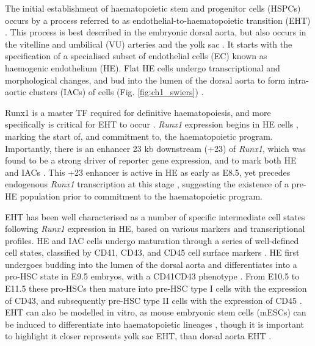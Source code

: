 The initial establishment of haematopoietic stem and progenitor cells (HSPCs) occurs by a process referred to as endothelial-to-haematopoietic transition (EHT) \citep{bertrand_haematopoietic_2010, boisset_vivo_2010, kissa_blood_2010}. This process is best described in the embryonic dorsal aorta, but also occurs in the vitelline and umbilical (VU) arteries and the yolk sac \citep{north_cbfa2_1999, zovein_fate_2008, samokhvalov_cell_2007, padron-barthe_clonal_2014, mcgrath_distinct_2015}. It starts with the specification of a specialised subset of endothelial cells (EC) known as haemogenic endothelium (HE). Flat HE cells undergo transcriptional and morphological changes, and bud into the lumen of the dorsal aorta to form intra-aortic clusters (IACs) of cells (Fig. \ref{fig:ch1_swiers}) \citep{boisset_vivo_2010, bertrand_haematopoietic_2010, kissa_blood_2010, swiers_early_2013}. 

Runx1 is a master TF required for definitive haematopoiesis, and more specifically is critical for EHT to occur \citep{okuda_aml1_1996, wang_disruption_1996, north_cbfa2_1999, cai_haploinsufficiency_2000, chen_runx1_2009}. \textit{Runx1} expression begins in HE cells \citep{north_cbfa2_1999}, marking the start of, and commitment to, the haematopoietic program. Importantly, there is an enhancer 23 kb downstream (+23) of \textit{Runx1}, which was found to be a strong driver of reporter gene expression, and to mark both HE and IACs \citep{nottingham_runx1-mediated_2007, bee_nonredundant_2010, ng_runx1_2010}. This +23 enhancer is active in HE as early as E8.5, yet precedes endogenous \textit{Runx1} transcription at this stage \citep{swiers_early_2013}, suggesting the existence of a pre-HE population prior to commitment to the haematopoietic program. 

EHT has been well characterised as a number of specific intermediate cell states following \textit{Runx1} expression in HE, based on various markers and transcriptional profiles. HE and IAC cells undergo maturation through a series of well-defined cell states, classified by CD41, CD43, and CD45 cell surface markers \citep{taoudi_extensive_2008, rybtsov_hierarchical_2011, rybtsov_tracing_2014, ottersbach_endothelial--haematopoietic_2019}. HE first undergoes budding into the lumen of the dorsal aorta and differentiates into a pro-HSC state in E9.5 embryos, with a CD41\upos{}CD43\uneg{} phenotype \citep{rybtsov_tracing_2014}. From E10.5 to E11.5 these pro-HSCs then mature into pre-HSC type I cells with the expression of CD43, and subsequently pre-HSC type II cells with the expression of CD45 \citep{rybtsov_hierarchical_2011, taoudi_extensive_2008}. EHT can also be modelled in vitro, as mouse embryonic stem cells (mESCs) can be induced to differentiate into haematopoietic lineages \citep{galic_t_2006, carpenter_human_2011, woll_human_2009, lu_platelets_2011}, though it is important to highlight it closer represents yolk sac EHT, than dorsal aorta EHT \citep{mcgrath_distinct_2015}.

